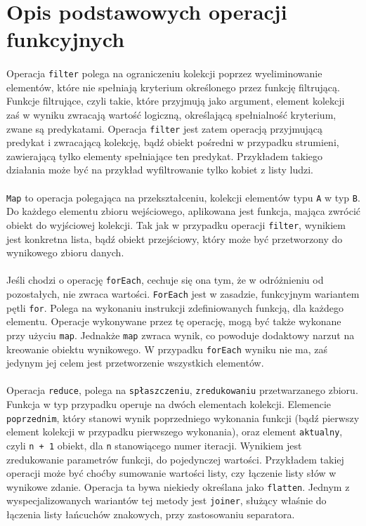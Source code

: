 \documentclass[a4paper,10pt]{report}
\begin{document}
\section{Opis podstawowych operacji funkcyjnych}
\paragraph{}
Operacja \verb|filter| polega na ograniczeniu kolekcji poprzez wyeliminowanie elementów, które nie spełniają kryterium określonego przez funkcję filtrującą. Funkcje filtrujące, czyli takie, które przyjmują jako argument, element kolekcji zaś w wyniku zwracają wartość logiczną, określającą spełnialność kryterium, zwane są predykatami. Operacja \verb|filter| jest zatem operacją przyjmującą predykat i zwracającą kolekcję, bądź obiekt pośredni w przypadku strumieni, zawierającą tylko elementy spełniające ten predykat. Przykładem takiego działania może być na przykład wyfiltrowanie tylko kobiet z listy ludzi.
\paragraph{}
\verb|Map| to operacja polegająca na przekształceniu, kolekcji elementów typu \verb|A| w typ \verb|B|. Do każdego elementu zbioru wejściowego, aplikowana jest funkcja, mająca zwrócić obiekt do wyjściowej kolekcji. Tak jak w przypadku operacji \verb|filter|, wynikiem jest konkretna lista, bądź obiekt przejściowy, który może być przetworzony do wynikowego zbioru danych.
\paragraph{}
Jeśli chodzi o operację \verb|forEach|, cechuje się ona tym, że w odróżnieniu od pozostałych, nie zwraca wartości. \verb|ForEach| jest w zasadzie, funkcyjnym wariantem pętli \verb|for|. Polega na wykonaniu instrukcji zdefiniowanych funkcją, dla każdego elementu. Operacje wykonywane przez tę operację, mogą być także wykonane przy użyciu \verb|map|. Jednakże \verb|map| zwraca wynik, co powoduje dodaktowy narzut na kreowanie obiektu wynikowego. W przypadku \verb|forEach| wyniku nie ma, zaś jedynym jej celem jest przetworzenie wszystkich elementów.
\paragraph{}
Operacja \verb|reduce|, polega na \verb|spłaszczeniu|, \verb|zredukowaniu| przetwarzanego zbioru. Funkcja w typ przypadku operuje na dwóch elementach kolekcji. Elemencie \verb|poprzednim|, który stanowi wynik poprzedniego wykonania funkcji (bądź pierwszy element kolekcji w przypadku pierwszego wykonania), oraz element \verb|aktualny|, czyli \verb|n + 1| obiekt, dla \verb|n| stanowiącego numer iteracji. Wynikiem jest zredukowanie parametrów funkcji, do pojedynczej wartości. Przykładem takiej operacji może być choćby sumowanie wartości listy, czy łączenie listy słów w wynikowe zdanie. Operacja ta bywa niekiedy określana jako \verb|flatten|. Jednym z wyspecjalizowanych wariantów tej metody jest \verb|joiner|, służący właśnie do łączenia listy łańcuchów znakowych, przy zastosowaniu separatora.
\end{document}
